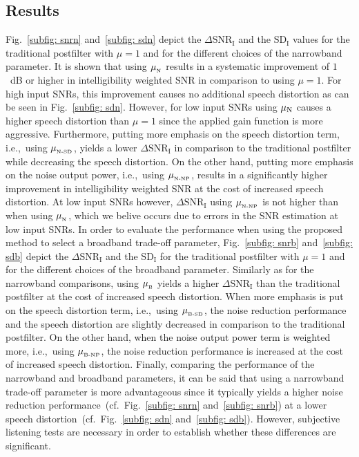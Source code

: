 \documentclass{article}
\begin{document}
\subsection{Results}
Fig.~\ref{subfig: snrn} and~\ref{subfig: sdn} depict the $\Delta \text{SNR}_{\text{I}}$ and the $\text{SD}_{\text{I}}$ values for the traditional postfilter with $\mu = 1$ and for the different choices of the narrowband parameter. 
It is shown that using $\mu_{_{\rm N}}$ results in a systematic improvement of $1$~dB or higher in intelligibility weighted SNR in comparison to using $\mu = 1$.
For high input SNRs, this improvement causes no additional speech distortion as can be seen in Fig.~\ref{subfig: sdn}. 
However, for low input SNRs using $\mu_{\rm N}$ causes a higher speech distortion than $\mu=1$ since the applied gain function is more aggressive. 
Furthermore, putting more emphasis on the speech distortion term, i.e.,~using $\mu_{_{\rm N\text{-}SD}}$, yields a lower $\Delta \text{SNR}_{\text{I}}$ in comparison to the traditional postfilter while decreasing the speech distortion. 
On the other hand, putting more emphasis on the noise output power, i.e.,~using $\mu_{_{\rm N\text{-}NP}}$, results in a significantly higher improvement in intelligibility weighted SNR at the cost of increased speech distortion.
At low input SNRs however, $\Delta \text{SNR}_{\text{I}}$ using $\mu_{_{\rm N\text{-}NP}}$ is not higher than when using $\mu_{_{\rm N}}$, which we belive occurs due to errors in the SNR estimation at low input SNRs. \newline
In order to evaluate the performance when using the proposed method to select a broadband trade-off parameter, Fig.~\ref{subfig: snrb} and~\ref{subfig: sdb} depict the $\Delta \text{SNR}_{\text{I}}$ and the $\text{SD}_{\text{I}}$ for the traditional postfilter with $\mu = 1$ and for the different choices of the broadband parameter.
Similarly as for the narrowband comparisons, using $\mu_{_{\rm B}}$ yields a higher $\Delta \text{SNR}_{\text{I}}$ than the traditional postfilter at the cost of increased speech distortion. 
When more emphasis is put on the speech distortion term, i.e.,~using $\mu_{_{\rm B\text{-}SD}}$, the noise reduction performance and the speech distortion are slightly decreased in comparison to the traditional postfilter.
On the other hand, when the noise output power term is weighted more, i.e.,~using $\mu_{_{\rm B\text{-}NP}}$, the noise reduction performance is increased at the cost of increased speech distortion. \newline
Finally, comparing the performance of the narrowband and broadband parameters, it can be said that using a narrowband trade-off parameter is more advantageous since it typically yields a higher noise reduction performance~(cf.~Fig.~\ref{subfig: snrn} and~\ref{subfig: snrb}) at a lower speech distortion~(cf.~Fig.~\ref{subfig: sdn} and~\ref{subfig: sdb}). 
However, subjective listening tests are necessary in order to establish whether these differences are significant.
\vspace{-0.45cm}
\end{document}
